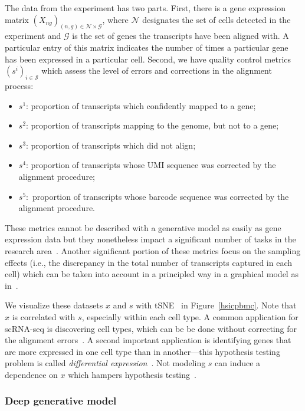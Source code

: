The data from the experiment has two parts. First, there is a gene expression matrix $(X_{ng})_{(n, g) \in \mathcal{N}\times\mathcal{G}}$, where $\mathcal{N}$ designates the set of cells detected in the experiment and $\mathcal{G}$ is the set of genes the transcripts have been aligned with. A particular entry of this matrix indicates the number of times a particular gene has been expressed in a particular cell. Second, we have quality control metrics $(s^i)_{i\in \mathcal{S}}$ which assess the level of errors and corrections in the alignment process:
\begin{itemize}
\item $s^1$: proportion of transcripts which confidently mapped to a gene;
\item $s^2$: proportion of transcripts mapping to the genome, but not to a gene;
\item $s^3$: proportion of transcripts which did not align;
\item $s^4$: proportion of transcripts whose UMI sequence was corrected by the alignment procedure;
\item $s^5$:~proportion of transcripts whose barcode sequence was corrected by the alignment procedure.
\end{itemize}
These metrics cannot be described with a generative model as easily as gene expression data but they nonetheless impact a significant number of tasks in the research area~\cite{Cole2017}. Another significant portion of these metrics focus on the sampling effects (i.e., the discrepancy in the total number of transcripts captured in each cell) which can be taken into account in a principled way in a graphical model as in~\cite{Lopez292037}. 




We visualize these datasets $x$ and $s$ with tSNE~\cite{Hinton2008} in Figure~\ref{hsicpbmc}. Note that $x$ is correlated with $s$, especially within each cell type. A common application for scRNA-seq is discovering cell types, which can be be done without correcting for the alignment errors~\cite{Wang2017}. A second important application is identifying genes that are more expressed in one cell type than in another---this hypothesis testing problem is called \emph{differential expression}~\cite{deseq2, mast}. Not modeling $s$ can induce a dependence on $x$ which hampers hypothesis testing~\cite{Cole2017}. 

\subsubsection{Deep generative model}

